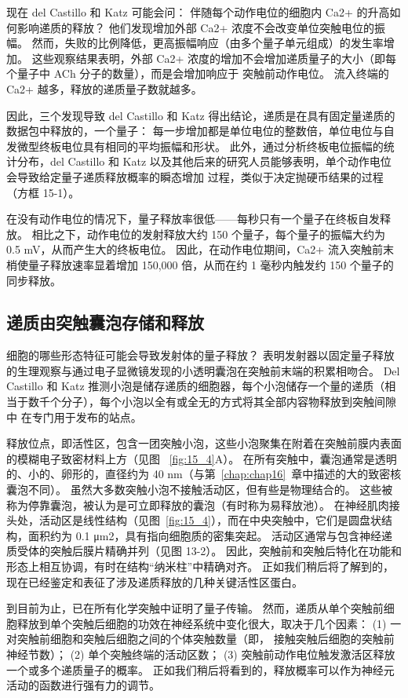 现在 del Castillo 和 Katz 可能会问：
伴随每个动作电位的细胞内 Ca2+ 的升高如何影响递质的释放？
他们发现增加外部 Ca2+ 浓度不会改变单位突触电位的振幅。
然而，失败的比例降低，更高振幅响应（由多个量子单元组成）的发生率增加。
这些观察结果表明，外部 Ca2+ 浓度的增加不会增加递质量子的大小（即每个量子中 ACh 分子的数量），而是会增加响应于 突触前动作电位。
流入终端的 Ca2+ 越多，释放的递质量子数就越多。


因此，三个发现导致 del Castillo 和 Katz 得出结论，递质是在具有固定量递质的数据包中释放的，一个量子：
每一步增加都是单位电位的整数倍，单位电位与自发微型终板电位具有相同的平均振幅和形状。
此外，通过分析终板电位振幅的统计分布，del Castillo 和 Katz 以及其他后来的研究人员能够表明，单个动作电位会导致给定量子递质释放概率的瞬态增加 过程，类似于决定抛硬币结果的过程（方框 15-1）。


在没有动作电位的情况下，量子释放率很低——每秒只有一个量子在终板自发释放。
相比之下，动作电位的发射释放大约 150 个量子，每个量子的振幅大约为 0.5 mV，从而产生大的终板电位。
因此，在动作电位期间，Ca2+ 流入突触前末梢使量子释放速率显着增加 150,000 倍，从而在约 1 毫秒内触发约 150 个量子的同步释放。



\subsection{递质由突触囊泡存储和释放}

细胞的哪些形态特征可能会导致发射体的量子释放？
表明发射器以固定量子释放的生理观察与通过电子显微镜发现的小透明囊泡在突触前末端的积累相吻合。
Del Castillo 和 Katz 推测小泡是储存递质的细胞器，每个小泡储存一个量的递质（相当于数千个分子），每个小泡以全有或全无的方式将其全部内容物释放到突触间隙中 在专门用于发布的站点。


释放位点，即活性区，包含一团突触小泡，这些小泡聚集在附着在突触前膜内表面的模糊电子致密材料上方（见图 ~\ref{fig:15_4}A）。
在所有突触中，囊泡通常是透明的、小的、卵形的，直径约为 40 nm（与第~\ref{chap:chap16}~章中描述的大的致密核囊泡不同）。
虽然大多数突触小泡不接触活动区，但有些是物理结合的。
这些被称为停靠囊泡，被认为是可立即释放的囊泡（有时称为易释放池）。
在神经肌肉接头处，活动区是线性结构（见图~\ref{fig:15_4}），而在中央突触中，它们是圆盘状结构，面积约为 0.1 μm2，具有指向细胞质的密集突起。
活动区通常与包含神经递质受体的突触后膜片精确并列（见图 13-2）。
因此，突触前和突触后特化在功能和形态上相互协调，有时在结构“纳米柱”中精确对齐。 
正如我们稍后将了解到的，现在已经鉴定和表征了涉及递质释放的几种关键活性区蛋白。


到目前为止，已在所有化学突触中证明了量子传输。
然而，递质从单个突触前细胞释放到单个突触后细胞的功效在神经系统中变化很大，取决于几个因素：
(1) 一对突触前细胞和突触后细胞之间的个体突触数量（即， 接触突触后细胞的突触前神经节数）；
(2) 单个突触终端的活动区数；
(3) 突触前动作电位触发激活区释放一个或多个递质量子的概率。
正如我们稍后将看到的，释放概率可以作为神经元活动的函数进行强有力的调节。


